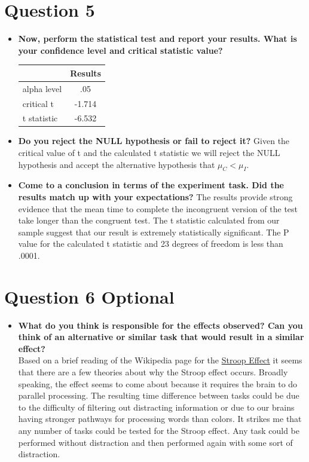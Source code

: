 \documentclass[a4paper,11pt]{report}
\begin{document}
\section{Question 5}
  \begin{itemize}
    \item \textbf{Now, perform the statistical test and report your results. What is your confidence level and critical statistic value?}
    \begin{center}
      \begin{tabular}{|| l c||}
      \hline
      & Results \\
      \hline\hline
      alpha level & .05 \\
      \hline
      critical t & -1.714 \\
      \hline
      t statistic & -6.532 \\
      \hline
      \end{tabular}
    \end{center}
    
    \item \textbf{Do you reject the NULL hypothesis or fail to reject it?}
    Given the critical value of t and the calculated t statistic we will reject the NULL hypothesis and accept the alternative hypothesis that \( \mu_C < \mu_I \).
    \item \textbf{Come to a conclusion in terms of the experiment task.  Did the results match up with your expectations?}
    The results provide strong evidence that the mean time to complete the incongruent version of the test take longer than the congruent test.  The t statistic calculated from our sample suggest that our result is extremely statistically significant.  The P value for the calculated t statistic and 23 degrees of freedom is less than .0001.
    
  \end{itemize}
  
\section{Question 6 Optional}
  \begin{itemize}
    \item \textbf{What do you think is responsible for the effects observed?  Can you think of an alternative or similar task that would result in a similar effect?}\\
    Based on a brief reading of the Wikipedia page for the \href{https://en.wikipedia.org/wiki/Stroop_effect}{Stroop Effect} it seems that there are a few theories about why the Stroop effect occurs.  Broadly speaking, the effect seems to come about because it requires the brain to do parallel processing.  The resulting time difference between tasks could be due to the difficulty of filtering out distracting information or due to our brains having stronger pathways for processing words than colors.  It strikes me that any number of tasks could be tested for the Stroop effect.  Any task could be performed without distraction and then performed again with some sort of distraction.
  
  \end{itemize}
  
\end{document}
